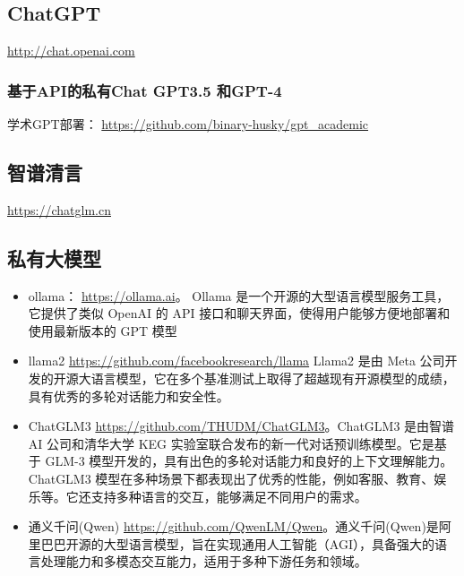 \documentclass[
]{ctexbook}
\begin{document}
\hypertarget{chatgpt}{%
\subsection{ChatGPT}\label{chatgpt}}

\url{http://chat.openai.com}

\hypertarget{ux57faux4e8eapiux7684ux79c1ux6709chat-gpt3.5-ux548cgpt-4}{%
\subsubsection{基于API的私有Chat GPT3.5 和GPT-4}\label{ux57faux4e8eapiux7684ux79c1ux6709chat-gpt3.5-ux548cgpt-4}}

学术GPT部署：
\url{https://github.com/binary-husky/gpt_academic}

\hypertarget{ux667aux8c31ux6e05ux8a00}{%
\subsection{智谱清言}\label{ux667aux8c31ux6e05ux8a00}}

\url{https://chatglm.cn}

\hypertarget{ux79c1ux6709ux5927ux6a21ux578b}{%
\subsection{私有大模型}\label{ux79c1ux6709ux5927ux6a21ux578b}}

\begin{itemize}
\item
  ollama： \url{https://ollama.ai}。 Ollama 是一个开源的大型语言模型服务工具，它提供了类似 OpenAI 的 API 接口和聊天界面，使得用户能够方便地部署和使用最新版本的 GPT 模型
\item
  llama2 \url{https://github.com/facebookresearch/llama} Llama2 是由 Meta 公司开发的开源大语言模型，它在多个基准测试上取得了超越现有开源模型的成绩，具有优秀的多轮对话能力和安全性。
\item
  ChatGLM3 \url{https://github.com/THUDM/ChatGLM3}。ChatGLM3 是由智谱 AI 公司和清华大学 KEG 实验室联合发布的新一代对话预训练模型。它是基于 GLM-3 模型开发的，具有出色的多轮对话能力和良好的上下文理解能力。ChatGLM3 模型在多种场景下都表现出了优秀的性能，例如客服、教育、娱乐等。它还支持多种语言的交互，能够满足不同用户的需求。
\item
  通义千问(Qwen) \url{https://github.com/QwenLM/Qwen}。通义千问(Qwen)是阿里巴巴开源的大型语言模型，旨在实现通用人工智能（AGI），具备强大的语言处理能力和多模态交互能力，适用于多种下游任务和领域。
\end{itemize}
\end{document}
